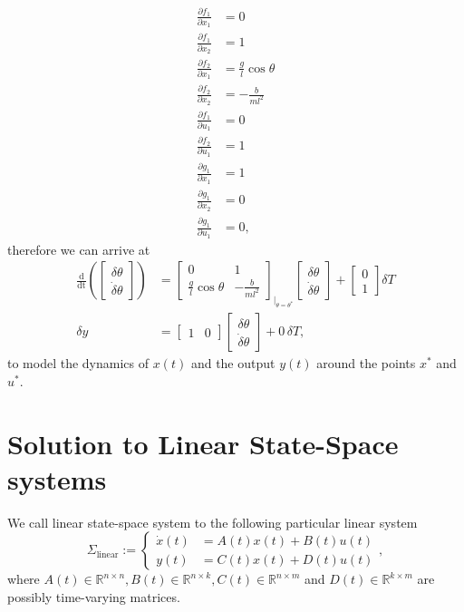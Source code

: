 \documentclass[11pt,a4paper,titlepage]{article}
\begin{document}
\begin{align}
\frac{\partial f_1}{\partial x_1} &= 0 \nonumber \\
\frac{\partial f_1}{\partial x_2} &= 1 \nonumber \\
\frac{\partial f_2}{\partial x_1} &= \frac{g}{l}\cos\theta \nonumber \\
\frac{\partial f_2}{\partial x_2} &= -\frac{b}{ml^2} \nonumber \\
\frac{\partial f_1}{\partial u_1} &= 0 \nonumber \\
\frac{\partial f_2}{\partial u_1} &= 1 \nonumber \\
\frac{\partial g_1}{\partial x_1} &= 1 \nonumber \\
\frac{\partial g_1}{\partial x_2} &= 0 \nonumber \\
\frac{\partial g_1}{\partial u_1} &= 0, \nonumber
\end{align}
therefore we can arrive at
\begin{align}
	\frac{\mathrm{d}}{\mathrm{dt}}\left(\begin{bmatrix}\delta\theta \\ \dot\delta\theta \end{bmatrix}\right) &= \begin{bmatrix}0 & 1 \\ \frac{g}{l}\cos\theta & -\frac{b}{ml^2} \end{bmatrix}_{|_{\theta=\theta^*}} \begin{bmatrix}\delta\theta \\ \dot\delta\theta \end{bmatrix} + \begin{bmatrix}0 \\ 1 \end{bmatrix} \delta T \nonumber \\
		\delta y &= \begin{bmatrix}1 & 0\end{bmatrix}\begin{bmatrix}\delta\theta \\ \dot\delta\theta \end{bmatrix} + 0 \, \delta T,
\end{align}
to model the dynamics of $x(t)$ and the output $y(t)$ around the points $x^*$ and $u^*$.

\section{Solution to Linear State-Space systems}
We call linear state-space system to the following particular linear system
\begin{equation}
	\Sigma_{\text{linear}} := \begin{cases}
	\dot x(t) &= A(t)x(t) + B(t)u(t) \\
	 y(t) &= C(t)x(t) + D(t)u(t)
	\end{cases},
\label{eq: sigmalin}
\end{equation}
where $A(t)\in\mathbb{R}^{n\times n},B(t)\in\mathbb{R}^{n\times k},C(t)\in\mathbb{R}^{n\times m}$ and $D(t)\in\mathbb{R}^{k\times m}$ are possibly time-varying matrices.
\end{document}
